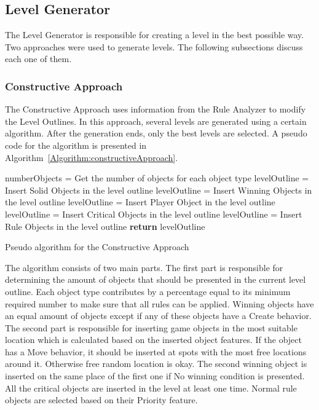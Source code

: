 \documentclass[letterpaper]{article}
\newcommand{\algref}[1]{Algorithm~\ref{Algorithm:#1}}
\begin{document}
\subsection{Level Generator}
The Level Generator is responsible for creating a level in the best possible way. Two approaches were used to generate levels. The following subsections discuss each one of them.

\subsubsection{Constructive Approach}
The Constructive Approach uses information from the Rule Analyzer to modify the Level Outlines. In this approach, several levels are generated using a certain algorithm. After the generation ends, only the best levels are selected. A pseudo code for the algorithm is presented in \algref{constructiveApproach}.\\\par

\setlength{\textfloatsep}{0pt}
\begin{algorithm}[ht]
	\BlankLine
	numberObjects = Get the number of objects for each object type\;
	\BlankLine
	levelOutline = Insert Solid Objects in the level outline\;
	levelOutline = Insert Winning Objects in the level outline\;
	levelOutline = Insert Player Object in the level outline\;
	levelOutline = Insert Critical Objects in the level outline\;
	levelOutline = Insert Rule Objects in the level outline\;
	\BlankLine
	\textbf{return} levelOutline\;
	\caption{Pseudo algorithm for the Constructive Approach}
	\label{Algorithm:constructiveApproach}
\end{algorithm}
\setlength{\textfloatsep}{10pt}

The algorithm consists of two main parts. The first part is responsible for determining the amount of objects that should be presented in the current level outline. Each object type contributes by a percentage equal to its minimum required number to make sure that all rules can be applied. Winning objects have an equal amount of objects except if any of these objects have a Create behavior. The second part is responsible for inserting game objects in the most suitable location which is calculated based on the inserted object features. If the object has a Move behavior, it should be inserted at spots with the most free locations around it. Otherwise free random location is okay. The second winning object is inserted on the same place of the first one if No winning condition is presented. All the critical objects are inserted in the level at least one time. Normal rule objects are selected based on their Priority feature.
\end{document}
